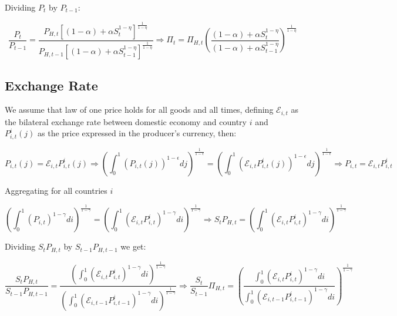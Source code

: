 \documentclass{article}
\newcommand{\E}{\mathcal{E}}
\begin{document}
Dividing $P_t$ by $P_{t-1}$:

\begin{equation}
    \label{tot}
    \frac{P_t}{P_{t-1}} = \frac{P_{H,t} \left[(1-\alpha) + \alpha S_t^{1-\eta} \right]^{\frac{1}{1-\eta}}} {P_{H,t-1} \left[(1-\alpha) + \alpha S_{t-1}^{1-\eta} \right]^{\frac{1}{1-\eta}}} \Rightarrow \Pi_t = \Pi_{H,t} \left(\frac{(1-\alpha) + \alpha S_t^{1-\eta}} {(1-\alpha) + \alpha S_{t-1}^{1-\eta}} \right)^{\frac{1}{1-\eta}}
\end{equation}

\subsection{Exchange Rate}
We assume that law of one price holds for all goods and all times, defining $\E_{i,t}$ as the bilateral exchange rate between domestic economy and country $i$ and $P^i_{i,t}(j)$ as the price expressed in the producer's currency, then:

\begin{equation}
    P_{i,t}(j) = \E_{i,t} P^i_{i,t}(j) \Rightarrow \left( \int^1_0 \left(P_{i,t}(j) \right)^{1-\epsilon} dj \right)^{\frac{1}{1-\epsilon}} = \left( \int^1_0 \left(\E_{i,t} P^i_{i,t}(j) \right)^{1-\epsilon} dj \right)^{\frac{1}{1-\epsilon}} \Rightarrow P_{i,t} = \E_{i,t} P^i_{i,t}
\end{equation}


Aggregating for all countries $i$

\begin{equation}
    \left( \int^1_0 \left(P_{i,t} \right)^{1-\gamma} di \right)^{\frac{1}{1-\gamma}} = \left( \int^1_0 \left(\E_{i,t} P^i_{i,t} \right)^{1-\gamma} di \right)^{\frac{1}{1-\gamma}} \Rightarrow S_t P_{H,t} = \left( \int^1_0 \left(\E_{i,t} P^i_{i,t} \right)^{1-\gamma} di \right)^{\frac{1}{1-\gamma}}
\end{equation}

Dividing $S_t P_{H,t}$ by $S_{t-1} P_{H,t-1}$ we get:

\begin{equation}
    \label{fx}
    \frac{S_t P_{H,t}}{S_{t-1} P_{H,t-1}} = \frac{\left( \int^1_0 \left(\E_{i,t} P^i_{i,t} \right)^{1-\gamma} di \right)^{\frac{1}{1-\gamma}}}{\left( \int^1_0 \left(\E_{i,t-1} P^i_{i,t-1} \right)^{1-\gamma} di \right)^{\frac{1}{1-\gamma}}} \Rightarrow \frac{S_t}{S_{t-1}}\Pi_{H,t} = \left(\frac{\int^1_0 \left(\E_{i,t} P^i_{i,t} \right)^{1-\gamma} di }{\int^1_0 \left(\E_{i,t-1} P^i_{i,t-1} \right)^{1-\gamma} di} \right)^{\frac{1}{1-\gamma}}
\end{equation}
\end{document}
